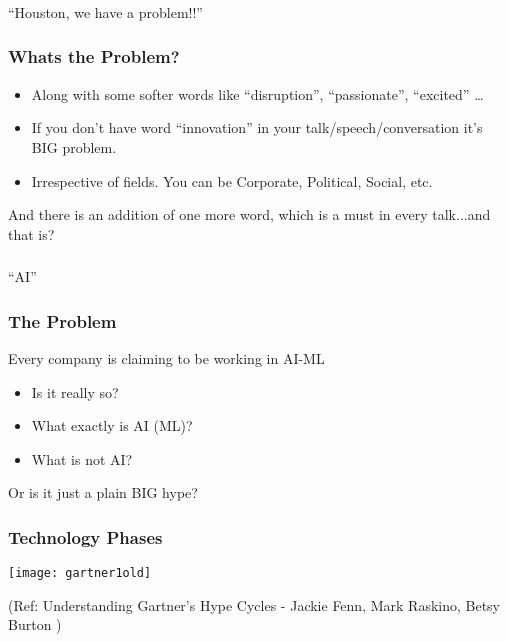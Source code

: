\begin{frame}[fragile]\frametitle{}
\begin{center}
{\Large ``Houston, we have a problem!!''}
\end{center}
\end{frame}

\begin{frame}[fragile]\frametitle{Whats the Problem?}
\begin{itemize}
\item Along with some softer words like ``disruption'', ``passionate'', ``excited'' \ldots
\item If you don't have word ``innovation'' in your talk/speech/conversation it's  BIG problem. 
\item Irrespective of fields. You can be Corporate, Political, Social, etc.
\end{itemize}


And there is an addition of one more word,  which is a must in every talk...and that is?


\end{frame}

\begin{frame}[fragile]\frametitle{}
\begin{center}
{\Large ``AI''}
\end{center}
\end{frame}


\begin{frame}[fragile]\frametitle{The Problem}
Every company is claiming to be working in AI-ML
\begin{itemize}
\item Is it really so?
\item What exactly is AI (ML)?
\item What is not AI?
\end{itemize}
Or is it just a plain BIG hype?
\end{frame}


\begin{frame}[fragile]\frametitle{Technology Phases}
\begin{center}
\texttt{[image: gartner1old]}
\end{center}
{\tiny (Ref: Understanding Gartner's Hype Cycles - Jackie Fenn, Mark Raskino, Betsy Burton )}
\end{frame}

